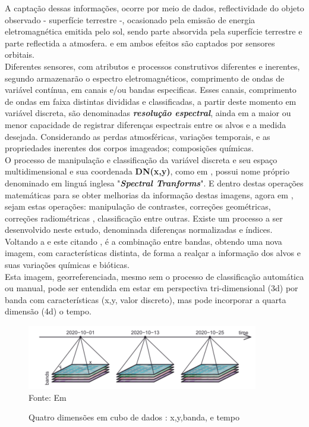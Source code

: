  \hspace*{1.25 cm} A captação dessas informações, ocorre por meio de dados, reflectividade do objeto observado - superfície terrestre -, ocasionado pela emissão de energia eletromagnética emitida pelo sol, sendo parte absorvida pela  superfície terrestre e parte reflectida a atmosfera. e em ambos efeitos são  captados  por sensores orbitais.\\
  \hspace*{1.25 cm} Diferentes sensores, com atributos e processos construtivos diferentes e  inerentes, segundo \cite[p.~20]{Centeno} armazenarão o espectro eletromagnéticos, comprimento de ondas de variável contínua, em canais e/ou bandas especificas. Esses canais, comprimento de ondas em faixa distintas divididas e  classificadas, a partir deste momento em variável discreta,  são denominadas \textbf{\textit{resolução espectral}}, ainda em \cite[p.~54]{Centeno} a maior ou menor capacidade de registrar diferenças espectrais entre os alvos e a medida desejada. Considerando as perdas atmosféricas, variações temporais, e as propriedades inerentes dos corpos imageados; composições químicas. \\
%
  \hspace*{1.25 cm} O processo  de manipulação e classificação da variável discreta e seu espaço multidimensional e sua coordenada  \textbf{DN(x,y)}, como em \cite[p.~183]{Schowengerdt}, possui nome próprio denominado em linguá inglesa  "\textbf{\textit{Spectral Tranforms}}". E dentro destas operações matemáticas para se obter melhorias da informação destas imagens, agora em \cite[p.~485]{Lilesat}, sejam estas operações: manipulação de contrastes, correções geométricas, correções radiométricas , classificação entre outras. Existe um processo a ser desenvolvido neste estudo, denominada diferenças normalizadas e índices.\\
%
%
 \hspace*{1.25 cm} Voltando a \cite{Centeno} e este citando \cite[p.339]{Chuvieco}, é a combinação entre bandas, obtendo uma nova imagem, com características distinta, de forma a realçar a informação dos alvos e suas variações químicas e bióticas. \\
%
\hspace*{1.25 cm} Esta imagem, georreferenciada, mesmo sem o processo de classificação automática ou manual, pode ser entendida em estar em  perspectiva tri-dimensional (3d) por banda com características (x,y, valor discreto), mas pode incorporar  a quarta dimensão (4d) o tempo.
\begin{figure}[H]
	\centering  \small \caption{Quatro dimensões  em cubo de dados : x,y,banda, e tempo}
	\includegraphics[width=0.97\linewidth]{FIGURAS//quatroDimensao}
	\label{fig:quatroDimensao}{ Fonte:  Em \cite[p.60]{Pebesma} }
\end{figure}

